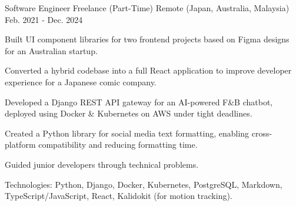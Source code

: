 

\begin{cventries}


  \cventry
    {Software Engineer} %
    {Freelance (Part-Time)} %
    {Remote (Japan, Australia, Malaysia)} %
    {Feb. 2021 - Dec. 2024} %
    {
      \begin{cvitems} %
        \item {Built UI component libraries for two frontend projects based on Figma designs for an Australian startup.}
        \item {Converted a hybrid codebase into a full React application to improve developer experience for a Japanese comic company.}
        \item {Developed a Django REST API gateway for an AI-powered F\&B chatbot, deployed using Docker \& Kubernetes on AWS under tight deadlines.}
        \item {Created a Python library for social media text formatting, enabling cross-platform compatibility and reducing formatting time.}
        \item {Guided junior developers through technical problems.}
        \item {Technologies: Python, Django, Docker, Kubernetes, PostgreSQL, Markdown, TypeScript/JavaScript, React, Kalidokit (for motion tracking).}
      \end{cvitems}
    }


\end{cventries}
